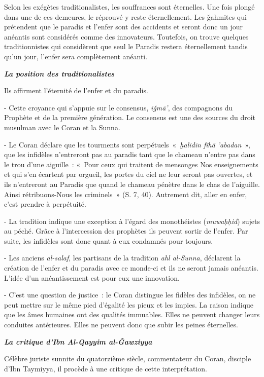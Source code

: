 Selon les exégètes traditionalistes, les souffrances sont éternelles.
Une fois plongé dans une de ces demeures, le réprouvé y reste
éternellement. Les ǧahmites qui prétendent que le paradis et l'enfer
sont des accidents et seront donc un jour anéantis sont considérés comme
des innovateurs. Toutefois, on trouve quelques traditionnistes qui
considèrent que seul le Paradis restera éternellement tandis qu'un jour,
l'enfer sera complètement anéanti.

\emph{\textbf{La position des traditionalistes}}

Ils affirment l'éternité de l'enfer et du paradis.

- Cette croyance qui s'appuie sur le consensus, \emph{iǧmā'}, des
compagnons du Prophète et de la première génération. Le consensus est
une des sources du droit musulman avec le Coran et la Sunna.

- Le Coran déclare que les tourments sont perpétuels~«~\emph{ḫalidīn
fîhā 'abadan}~», que les infidèles n'entreront pas au paradis tant que
le chameau n'entre pas dans le trou d'une aiguille~: «~Pour ceux qui
traitent de mensonges Nos enseignements et qui s'en écartent par
orgueil, les portes du ciel ne leur seront pas ouvertes, et ils
n'entreront au Paradis que quand le chameau pénètre dans le chas de
l'aiguille. Ainsi rétribuons-Nous les criminels~» (S. 7, 40). Autrement
dit, aller en enfer, c'est prendre à perpétuité.

- La tradition indique une exception à l'égard des monothéistes
(\emph{muwaḥḥid}) sujets au péché. Grâce à l'intercession des prophètes
ils peuvent sortir de l'enfer. Par suite, les infidèles sont donc quant
à eux condamnés pour toujours.

- Les anciens \emph{al-salaf}, les partisans de la tradition \emph{ahl
al-Sunna}, déclarent la création de l'enfer et du paradis avec ce
monde-ci et ils ne seront jamais anéantis. L'idée d'un anéantissement
est pour eux une innovation.

- C'est une question de justice~: le Coran distingue les fidèles des
infidèles, on ne peut mettre sur le même pied d'égalité les pieux et les
impies. La raison indique que les âmes humaines ont des qualités
immuables. Elles ne peuvent changer leurs conduites antérieures. Elles
ne peuvent donc que subir les peines éternelles.

\emph{\textbf{La critique d'Ibn Al-Qayyim al-Ǧawziyya}}

Célèbre juriste sunnite du quatorzième siècle, commentateur du Coran,
disciple d'Ibn Taymiyya, il procède à une critique de cette
interprétation.

